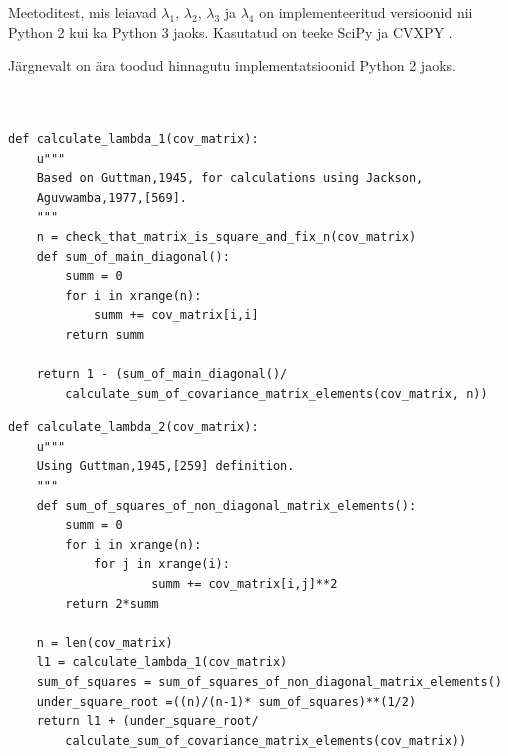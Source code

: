 \documentclass[a4paper,12pt,oneside]{article}
\newenvironment{customFloatWrap}{}{}
\numberwithin{equation}{section}
\theoremstyle{definition}
\begin{document}
Meetoditest, mis leiavad $\lambda_1$, $\lambda_2$, $\lambda_3$ ja $\lambda_4$ on implementeeritud versioonid nii Python 2 kui ka Python 3 jaoks. Kasutatud on teeke SciPy \cite{JonesE.;OliphantT;Peterson} ja CVXPY \cite{DiamondS;ChuE;Boyd2014}.


Järgnevalt on ära toodud hinnagutu implementatsioonid Python 2 jaoks.


\pagebreak

\begin{customFloatWrap}
\begin{verbatim}


def calculate_lambda_1(cov_matrix):
    u""" 
    Based on Guttman,1945, for calculations using Jackson,
    Aguvwamba,1977,[569].
    """
    n = check_that_matrix_is_square_and_fix_n(cov_matrix)
    def sum_of_main_diagonal():
        summ = 0
        for i in xrange(n):
            summ += cov_matrix[i,i]
        return summ

    return 1 - (sum_of_main_diagonal()/
    	calculate_sum_of_covariance_matrix_elements(cov_matrix, n))

\end{verbatim}
\end{customFloatWrap}

\vspace{10pt}


\begin{customFloatWrap}
\begin{verbatim}
def calculate_lambda_2(cov_matrix):
    u"""
    Using Guttman,1945,[259] definition.
    """
    def sum_of_squares_of_non_diagonal_matrix_elements():
        summ = 0
        for i in xrange(n):
            for j in xrange(i):
                    summ += cov_matrix[i,j]**2 
        return 2*summ
    
    n = len(cov_matrix)
    l1 = calculate_lambda_1(cov_matrix)
    sum_of_squares = sum_of_squares_of_non_diagonal_matrix_elements()
    under_square_root =((n)/(n-1)* sum_of_squares)**(1/2)
    return l1 + (under_square_root/
        calculate_sum_of_covariance_matrix_elements(cov_matrix))
\end{verbatim}
\end{customFloatWrap}
\end{document}
